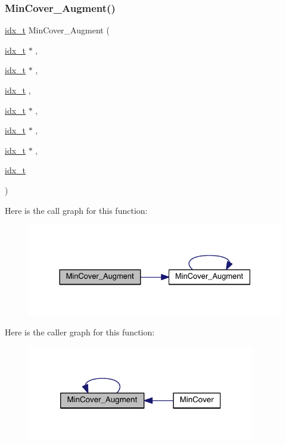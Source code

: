 \subsubsection{\texorpdfstring{Min\+Cover\+\_\+\+Augment()}{MinCover\_Augment()}}
{\footnotesize\ttfamily \hyperlink{a00876_aaa5262be3e700770163401acb0150f52}{idx\+\_\+t} Min\+Cover\+\_\+\+Augment (\begin{DoxyParamCaption}\item[{\hyperlink{a00876_aaa5262be3e700770163401acb0150f52}{idx\+\_\+t} $\ast$}]{,  }\item[{\hyperlink{a00876_aaa5262be3e700770163401acb0150f52}{idx\+\_\+t} $\ast$}]{,  }\item[{\hyperlink{a00876_aaa5262be3e700770163401acb0150f52}{idx\+\_\+t}}]{,  }\item[{\hyperlink{a00876_aaa5262be3e700770163401acb0150f52}{idx\+\_\+t} $\ast$}]{,  }\item[{\hyperlink{a00876_aaa5262be3e700770163401acb0150f52}{idx\+\_\+t} $\ast$}]{,  }\item[{\hyperlink{a00876_aaa5262be3e700770163401acb0150f52}{idx\+\_\+t} $\ast$}]{,  }\item[{\hyperlink{a00876_aaa5262be3e700770163401acb0150f52}{idx\+\_\+t}}]{ }\end{DoxyParamCaption})}

Here is the call graph for this function\+:\nopagebreak
\begin{figure}[H]
\begin{center}
\leavevmode
\includegraphics[width=328pt]{a00945_a40e05f15cea2a5fd463adabd12918907_cgraph}
\end{center}
\end{figure}
Here is the caller graph for this function\+:\nopagebreak
\begin{figure}[H]
\begin{center}
\leavevmode
\includegraphics[width=282pt]{a00945_a40e05f15cea2a5fd463adabd12918907_icgraph}
\end{center}
\end{figure}
\mbox{\label{a00945_aa53562f944f7971ae3bc760f9ac41774}} 
